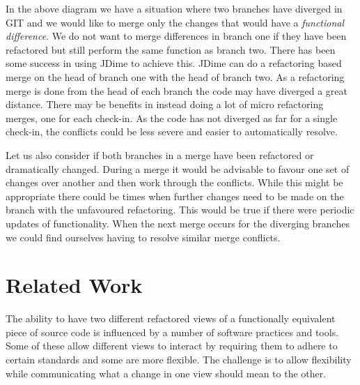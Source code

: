 \documentclass[12pt]{CRPITStyle}
\begin{document}
In the above diagram we have a situation where two branches have diverged in GIT and we would like to merge only the changes that would have a \emph{functional difference}. We do not want to merge differences in branch one if they have been refactored but still perform the same function as branch two. There has been some success in using JDime to achieve this. JDime can do a refactoring based merge on the head of branch one with the head of branch two. As a refactoring merge is done from the head of each branch the code may have diverged a great distance. There may be benefits in instead doing a lot of micro refactoring merges, one for each check-in. As the code has not diverged as far for a single check-in, the conflicts could be less severe and easier to automatically resolve. 

Let us also consider if both branches in a merge have been refactored or dramatically changed. During a merge it would be advisable to favour one set of changes over another and then work through the conflicts. While this might be appropriate there could be times when further changes need to be made on the branch with the unfavoured refactoring. This would be true if there were periodic updates of functionality. When the next merge occurs for the diverging branches we could find ourselves having to resolve similar merge conflicts. 

\section{Related Work}
The ability to have two different refactored views of a functionally equivalent piece of source code is influenced by a number of software practices and tools. Some of these allow different views to interact by requiring them to adhere to certain standards and some are more flexible. The challenge is to allow flexibility while communicating what a change in one view should mean to the other. 
\end{document}
